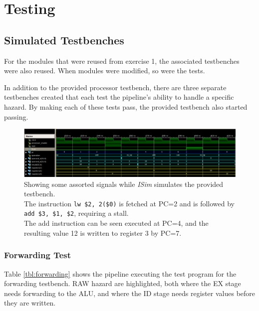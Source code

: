 \section{Testing}
\subsection{Simulated Testbenches}
For the modules that were reused from exercise 1,
the associated testbenches were also reused.
When modules were modified,
so were the tests.

In addition to the provided processor testbench,
there are three separate testbenches created that each test the pipeline's ability to handle a specific hazard.
By making each of these tests pass, the provided testbench also started passing.

\begin{figure}[h]
    \centering
    \includegraphics[width=\textwidth]{img/isim}
    \caption{Showing some assorted signals while \textit{ISim} simulates the provided testbench.\\
        The instruction \texttt{lw \$2, 2(\$0)} is fetched at PC=2 and is followed by \texttt{add \$3, \$1, \$2},
        requiring a stall.\\
        The add instruction can be seen executed at PC=4,
         and the resulting value 12 is written to register 3 by PC=7.
    }
    \label{fig:isim}
\end{figure}

\subsubsection{Forwarding Test}
Table \ref{tbl:forwarding} shows the pipeline executing the test program for the forwarding testbench.
RAW hazard are highlighted,
both where the EX stage needs forwarding to the ALU,
and where the ID stage needs register values before they are written.

